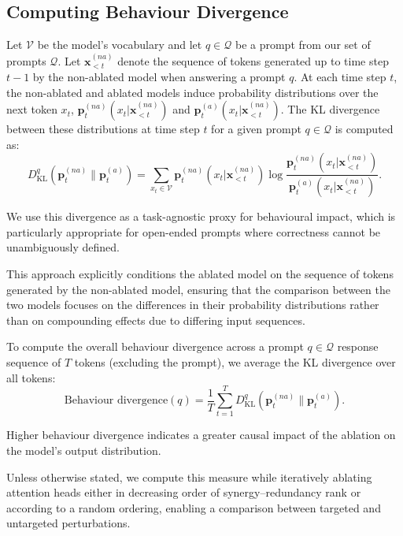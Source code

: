 \documentclass[11pt,a4paper]{ouparticle}
\begin{document}
\subsection*{Computing Behaviour Divergence}\label{sec:behaviour-divergence-methods}

Let $\mathcal V$ be the model's vocabulary and let $q\in \mathcal Q$ be a prompt from our set of prompts $\mathcal Q$. Let $ \mathbf{x}_{<t}^{(na)} $ denote the sequence of tokens generated up to time step $ t-1 $ by the non-ablated model when answering a prompt $q$. At each time step $ t $, the non-ablated and ablated models induce probability distributions over the next token $ x_t $, $ \mathbf{p}_t^{(na)}(x_t | \mathbf{x}_{<t}^{(na)})$ and $\mathbf{p}_t^{(a)}(x_t | \mathbf{x}_{<t}^{(na)})$. The KL divergence between these distributions at time step $ t $ for a given prompt $q\in \mathcal Q$ is computed as:
\begin{equation*}
D_{\text{KL}}^q(\mathbf{p}_t^{(na)} \| \mathbf{p}_t^{(a)}) = \sum_{x_t \in \mathcal V} \mathbf{p}_t^{(na)}(x_t | \mathbf{x}_{<t}^{(na)}) \log \frac{\mathbf{p}_t^{(na)}(x_t | \mathbf{x}_{<t}^{(na)})}{\mathbf{p}_t^{(a)}(x_t | \mathbf{x}_{<t}^{(na)})}.
\end{equation*}

We use this divergence as a task-agnostic proxy for behavioural impact, which is particularly appropriate for open-ended prompts where correctness cannot be unambiguously defined.

This approach explicitly conditions the ablated model on the sequence of tokens generated by the non-ablated model, ensuring that the comparison between the two models focuses on the differences in their probability distributions rather than on compounding effects due to differing input sequences. 

To compute the overall behaviour divergence across a prompt $q\in \mathcal Q$ response sequence of $ T $ tokens (excluding the prompt), we average the KL divergence over all tokens:
\begin{equation*}
\text{Behaviour divergence}(q) = \frac{1}{T} \sum_{t=1}^{T} D^q_{\text{KL}}(\mathbf{p}_t^{(na)} \| \mathbf{p}_t^{(a)}).
\end{equation*}

Higher behaviour divergence indicates a greater causal impact of the ablation on the model’s output distribution.

Unless otherwise stated, we compute this measure while iteratively ablating attention heads either in decreasing order of synergy–redundancy rank or according to a random ordering, enabling a comparison between targeted and untargeted perturbations.
\end{document}
